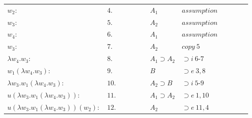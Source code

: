 \documentclass[11pt,a4paper]{article}
\begin{document}
\begin{itemize}
\begin{table}[H]
\begin{tabular}{*{12}{l}}
			\cline{4-11}
			
			$w_2:$ & $4.$ & \multicolumn{1}{|c}{} & \multicolumn{1}{|c}{} & & & $A_1$ & $assumption$ & & & \multicolumn{1}{c|}{} &\multicolumn{1}{c|}{}\\
			
			\cline{5-10}
			
			$w_3:$ & $5.$ & \multicolumn{1}{|c}{} & \multicolumn{1}{|c}{} & \multicolumn{1}{|c}{} & & $A_2$ & $assumption$ & & \multicolumn{1}{c|}{} & \multicolumn{1}{c|}{} &\multicolumn{1}{c|}{}\\
			
			\cline{6-9}
			
			$w_4:$ & $6.$ & \multicolumn{1}{|c}{} & \multicolumn{1}{|c}{} & \multicolumn{1}{|c}{} & \multicolumn{1}{|c}{} & $A_1$ & $assumption$ & \multicolumn{1}{c|}{} & \multicolumn{1}{c|}{} & \multicolumn{1}{c|}{} &\multicolumn{1}{c|}{}\\
			
			$w_3:$ & $7.$ & \multicolumn{1}{|c}{} & \multicolumn{1}{|c}{} & \multicolumn{1}{|c}{} & \multicolumn{1}{|c}{} & $A_2$ & $copy \ 5$ & \multicolumn{1}{c|}{} & \multicolumn{1}{c|}{} & \multicolumn{1}{c|}{} &\multicolumn{1}{c|}{}\\
			
			\cline{6-9}
			
			$\lambda w_4 . w_3:$ & $8.$ & \multicolumn{1}{|c}{} & \multicolumn{1}{|c}{} & \multicolumn{1}{|c}{} & & $A_1 \supset A_2$ & $\supset i \ 6$-$7$ & & \multicolumn{1}{c|}{} & \multicolumn{1}{c|}{} &\multicolumn{1}{c|}{}\\
			
			$w_1(\lambda w_4 . w_3):$ & $9.$ & \multicolumn{1}{|c}{} & \multicolumn{1}{|c}{} & \multicolumn{1}{|c}{} & & $B$ & $\supset e \ 3, 8$ & & \multicolumn{1}{c|}{} & \multicolumn{1}{c|}{} &\multicolumn{1}{c|}{}\\
			
			\cline{5-10}
			
			$\lambda w_3 . w_1(\lambda w_4 . w_3):$ & $10.$ & \multicolumn{1}{|c}{} & \multicolumn{1}{|c}{} & & & $A_2 \supset B$ & $\supset i \ 5$-$9$ & & & \multicolumn{1}{c|}{} &\multicolumn{1}{c|}{}\\
			
			$u(\lambda w_3 . w_1(\lambda w_4 . w_3)):$ & $11.$ & \multicolumn{1}{|c}{} & \multicolumn{1}{|c}{} & & & $A_1 \supset A_2$ & $\supset e \ 1, 10$ & & & \multicolumn{1}{c|}{} &\multicolumn{1}{c|}{}\\
			
			$u(\lambda w_3 . w_1(\lambda w_4 . w_3))(w_2):$ & $12.$ & \multicolumn{1}{|c}{} & \multicolumn{1}{|c}{} & & & $A_2$ & $\supset e \ 11, 4$ & & & \multicolumn{1}{c|}{} &\multicolumn{1}{c|}{}\\
						

\end{tabular}
\end{table}
\end{itemize}
\end{document}
